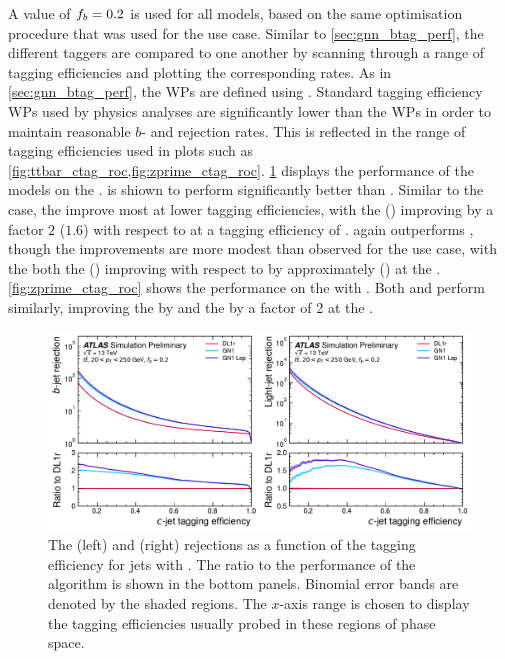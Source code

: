 A value of $f_b = 0.2$ is used for all models, based on the same optimisation procedure that was used for the \btag use case.
Similar to \cref{sec:gnn_btag_perf}, the different taggers are compared to one another by scanning through a range of \cjet tagging efficiencies and plotting the corresponding \blrej rates.
As in \cref{sec:gnn_btag_perf}, the WPs are defined using \ttbarjets.
Standard \cjet tagging efficiency WPs used by physics analyses are significantly lower than the \btag WPs in order to maintain reasonable $b$- and \ljet rejection rates.
This is reflected in the range of \cjet tagging efficiencies used in \ctag plots such as \cref{fig:ttbar_ctag_roc,fig:zprime_ctag_roc}.
\cref{fig:ttbar_ctag_roc} displays the \ctag performance of the models on the \ttbarjets.
\GNN is shiown to perform significantly better than \DLr.
Similar to the \btag case, the \blrej improve most at lower \cjet tagging efficiencies, with the \crej (\lrej) improving by a factor $2$ ($1.6$) with respect to \DLr at a \cjet tagging efficiency of .
\GNNLep again outperforms \GNN, though the improvements are more modest than observed for the \btag use case, with the both the \brej (\lrej) improving with respect to \GNN by approximately  () at the .
\cref{fig:zprime_ctag_roc} shows the \ctag performance on the \Zprimejets with \Zprimept.
Both \GNN and \GNNLep perform similarly, improving the \brej by  and the \lrej by a factor of 2 at the .

\begin{figure}[!p]
    \centering
    \includegraphics[width=\textwidth]{chapters/gnn_tagger/figs/results/main/ttbar/ttbar_roc_ctag.pdf}
    \caption{
        The \bjet (left) and \ljet (right) rejections as a function of the \cjet tagging efficiency for \ttbar jets with \ttbarpt \cite{ATL-PHYS-PUB-2022-027}.
        The ratio to the performance of the \DLr algorithm is shown in the bottom panels.
        Binomial error bands are denoted by the shaded regions.
        The $x$-axis range is chosen to display the \cjet tagging efficiencies usually probed in these regions of phase space.
    }
    \label{fig:ttbar_ctag_roc}
\end{figure}

